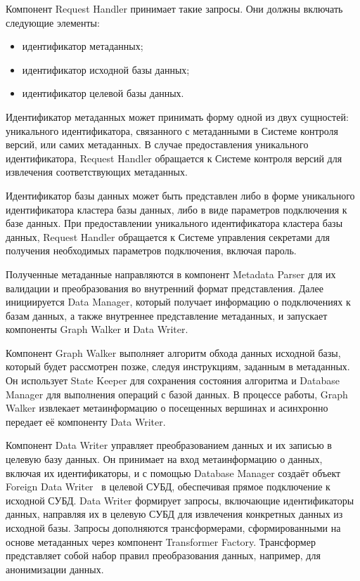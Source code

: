 Компонент Request Handler принимает такие запросы. Они должны включать следующие элементы:

\begin{itemize}
  \item идентификатор метаданных;
  \item идентификатор исходной базы данных;
  \item идентификатор целевой базы данных.
\end{itemize}

Идентификатор метаданных может принимать форму одной из двух сущностей: уникального идентификатора, связанного с метаданными в Системе контроля версий, или самих метаданных. В случае предоставления уникального идентификатора, Request Handler обращается к Системе контроля версий для извлечения соответствующих метаданных.

Идентификатор базы данных может быть представлен либо в форме уникального идентификатора кластера базы данных, либо в виде параметров подключения к базе данных. При предоставлении уникального идентификатора кластера базы данных, Request Handler обращается к Системе управления секретами для получения необходимых параметров подключения, включая пароль.

Полученные метаданные направляются в компонент Metadata Parser для их валидации и преобразования во внутренний формат представления. Далее инициируется Data Manager, который получает информацию о подключениях к базам данных, а также внутреннее представление метаданных, и запускает компоненты Graph Walker и Data Writer.

Компонент Graph Walker выполняет алгоритм обхода данных исходной базы, который будет рассмотрен позже, следуя инструкциям, заданным в метаданных. Он использует State Keeper для сохранения состояния алгоритма и Database Manager для выполнения операций с базой данных. В процессе работы, Graph Walker извлекает метаинформацию о посещенных вершинах и асинхронно передает её компоненту Data Writer.

Компонент Data Writer управляет преобразованием данных и их записью в целевую базу данных. Он принимает на вход метаинформацию о данных, включая их идентификаторы, и с помощью Database Manager создаёт объект Foreign Data Writer~\cite{fdw} в целевой СУБД, обеспечивая прямое подключение к исходной СУБД. Data Writer формирует запросы, включающие идентификаторы данных, направляя их в целевую СУБД для извлечения конкретных данных из исходной базы. Запросы дополняются трансформерами, сформированными на основе метаданных через компонент Transformer Factory. Трансформер представляет собой набор правил преобразования данных, например, для анонимизации данных.

